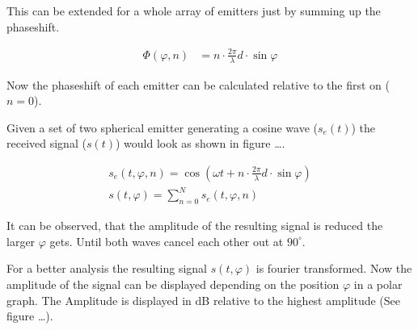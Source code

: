 This can be extended for a whole array of emitters just by summing up the phaseshift.

\begin{align}
  \Phi(\varphi, n) &= n \cdot \frac{2\pi}{\lambda} d \cdot \sin \varphi
\end{align}

Now the phaseshift of each emitter can be calculated relative to the first on (\(n = 0\)).

Given a set of two spherical emitter generating a cosine wave (\(s_e(t)\)) the received signal (\(s(t)\)) would look as shown in figure \dots.

\begin{align}
  s_e(t, \varphi, n) = \cos (\omega t + n \cdot \frac{2\pi}{\lambda} d \cdot \sin \varphi )\\[1em]
  s(t, \varphi) = \sum_{n = 0}^{N} s_e(t, \varphi, n)
\end{align}

It can be observed, that the amplitude of the resulting signal is reduced the larger \(\varphi\) gets. Until both waves cancel each other out at \(90^\circ\).

For a better analysis the resulting signal \(s(t, \varphi)\) is fourier transformed. Now the amplitude of the signal can be displayed depending on the position \(\varphi\) in a polar graph. The Amplitude is displayed in dB relative to the highest amplitude (See figure \dots).